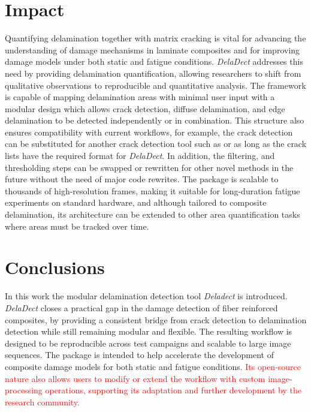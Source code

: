\documentclass[final,5p,times]{elsarticle}
\newcommand{\revision}[1]{\textcolor{red}{#1}}
\begin{document}
	
	\section{Impact}
	\label{loc:impact}
	Quantifying delamination together with matrix cracking is vital for advancing the understanding of damage mechanisms in laminate composites and for improving damage models under both static and fatigue conditions. \textit{DelaDect} addresses this need by providing delamination quantification, allowing researchers to shift from qualitative observations to reproducible and quantitative analysis. The framework is capable of mapping delamination areas with minimal user input with a modular design which allows crack detection, diffuse delamination, and edge delamination to be detected independently or in combination. This structure also ensures compatibility with current workflows, for example, the crack detection can be substituted for another crack detection tool such as \cite{nicolAutomatedCrackDetection2023} or \cite{olesenMatrixCraCSAutomatedTracking2024} as long as the crack lists have the required format for \textit{DelaDect}. In addition, the filtering, and thresholding steps can be swapped or rewritten for other novel methods in the future without the need of major code rewrites. The package is scalable to thousands of high-resolution frames, making it suitable for long-duration fatigue experiments on standard hardware, and although tailored to composite delamination, its architecture can be extended to other area quantification tasks where areas must be tracked over time.
	\section{Conclusions}
	\label{loc:conclusions}
	In this work the modular delamination detection tool \textit{Deladect} is introduced. \textit{DelaDect} closes a practical gap in the damage detection of fiber reinforced composites, by providing a consistent bridge from crack  detection to delamination detection while still remaining modular and flexible. The resulting workflow is designed to be reproducible across test campaigns and scalable to large image sequences. The package is intended to help accelerate the development of composite damage models for both static and fatigue conditions. \revision{Its open-source nature also allows users to modify or extend the workflow with custom image-processing operations, supporting its adaptation and further development by the research community.}
	
\end{document}
